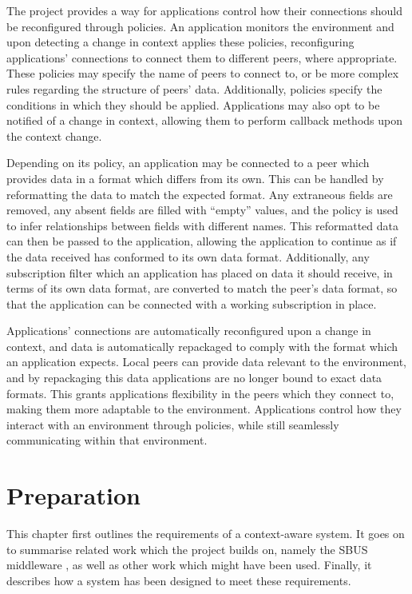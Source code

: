 \documentclass[12pt,twoside,notitlepage]{report}
\begin{document}
The project provides a way for applications control how their connections should be reconfigured through policies. 
An application monitors the environment and upon detecting a change in context applies these policies, reconfiguring applications' connections to connect them to different peers, where appropriate.
These policies may specify the name of peers to connect to, or be more complex rules regarding the structure of peers' data. 
Additionally, policies specify the conditions in which they should be applied. 
Applications may also opt to be notified of a change in context, allowing them to perform callback methods upon the context change.

Depending on its policy, an application may be connected to a peer which provides data in a format which differs from its own.
This can be handled by reformatting the data to match the expected format. 
Any extraneous fields are removed, any absent fields are filled with ``empty'' values, and the policy is used to infer relationships between fields with different names. 
This reformatted data can then be passed to the application, allowing the application to continue as if the data received has conformed to its own data format. 
Additionally, any subscription filter which an application has placed on data it should receive, in terms of its own data format, are converted to match the peer's data format, so that the application can be connected with a working subscription in place. 


Applications' connections are automatically reconfigured upon a change in context, and data is automatically repackaged to comply with the format which an application expects. 
Local peers can provide data relevant to the environment, and by repackaging this data applications are no longer bound to exact data formats. 
This grants applications flexibility in the peers which they connect to, making them more adaptable to the environment. 
Applications control how they interact with an environment through policies, while still seamlessly communicating within that environment.

\cleardoublepage

 
\chapter{Preparation}

This chapter first outlines the requirements of a context-aware system. 
It goes on to summarise related work which the project builds on, namely the SBUS middleware \cite{ingram2009reconfigurable}, as well as other work which might have been used. 
Finally, it describes how a system has been designed to meet these requirements.
\end{document}
